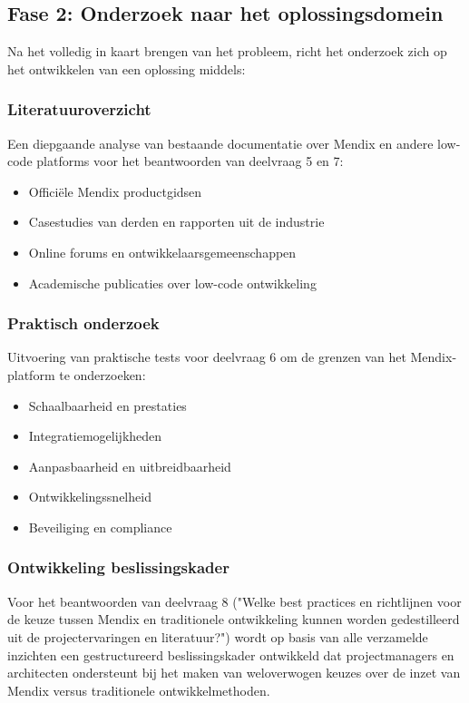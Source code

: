 \subsection{Fase 2: Onderzoek naar het oplossingsdomein}
Na het volledig in kaart brengen van het probleem, richt het onderzoek zich op het ontwikkelen van een oplossing middels:
\subsubsection{Literatuuroverzicht}
Een diepgaande analyse van bestaande documentatie over Mendix en andere low-code platforms voor het beantwoorden van deelvraag 5 en 7:
\begin{itemize}
    \item Officiële Mendix productgidsen
    \item Casestudies van derden en rapporten uit de industrie
    \item Online forums en ontwikkelaarsgemeenschappen
    \item Academische publicaties over low-code ontwikkeling
\end{itemize}
\subsubsection{Praktisch onderzoek}
Uitvoering van praktische tests voor deelvraag 6 om de grenzen van het Mendix-platform te onderzoeken:
\begin{itemize}
    \item Schaalbaarheid en prestaties
    \item Integratiemogelijkheden
    \item Aanpasbaarheid en uitbreidbaarheid
    \item Ontwikkelingssnelheid
    \item Beveiliging en compliance
\end{itemize}
\subsubsection{Ontwikkeling beslissingskader}
Voor het beantwoorden van deelvraag 8 ("Welke best practices en richtlijnen voor de keuze tussen Mendix en traditionele ontwikkeling kunnen worden gedestilleerd uit de projectervaringen en literatuur?") wordt op basis van alle verzamelde inzichten een gestructureerd beslissingskader ontwikkeld dat projectmanagers en architecten ondersteunt bij het maken van weloverwogen keuzes over de inzet van Mendix versus traditionele ontwikkelmethoden.



